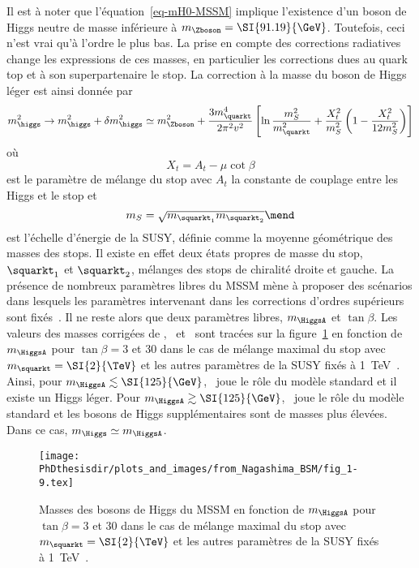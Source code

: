 Il est à noter que l'équation~\eqref{eq-mH0-MSSM} implique l'existence d'un boson de Higgs neutre de masse inférieure à $m_{\Zboson}=\SI{91.19}{\GeV}$.
Toutefois, ceci n'est vrai qu'à l'ordre le plus bas.
La prise en compte des corrections radiatives change les expressions de ces masses, en particulier les corrections dues au quark top et à son superpartenaire le stop.
La correction à la masse du boson de Higgs léger est ainsi donnée par~\cite{Nagashima_BSM}
\begin{equation}
m_{\higgs}^2 \to m_{\higgs}^2 + \delta m_{\higgs}^2
\simeq m_{\Zboson}^2
+ \frac{3 m_{\quarkt}^4}{2 \pi^2 v^2} \left[ \ln\frac{m_S^2}{m_{\quarkt}^2} + \frac{X_t^2}{m_S^2}\left(1-\frac{X_t^2}{12 m_S^2} \right) \right]
\end{equation}
où
\begin{equation}
X_t = A_t - \mu\cot\beta
\end{equation}
est le paramètre de mélange du stop avec $A_t$ la constante de couplage entre les Higgs et le stop
et
\begin{equation}
m_S = \sqrt{m_{\squarkt_1}m_{\squarkt_2}}
\mend
\end{equation}
est l'échelle d'énergie de la SUSY, définie comme la moyenne géométrique des masses des stops.
Il existe en effet deux états propres de masse du stop, $\squarkt_1$ et $\squarkt_2$, mélanges des stops de chiralité droite et gauche.
La présence de nombreux paramètres libres du MSSM mène à proposer des scénarios dans lesquels les paramètres intervenant dans les corrections d'ordres supérieurs sont fixés~\cite{Carena_2013,Bagnaschi_2019}.
Il ne reste alors que deux paramètres libres, $m_{\HiggsA}$ et $\tan\beta$.
Les valeurs des masses corrigées de \higgs, \Higgs\ et \Higgspm\ sont tracées sur la figure~\ref{fig-Higgs_corrected_masses_as_fct_of_mA_and_tanbeta} en fonction de $m_{\HiggsA}$ pour $\tan\beta=3$ et $30$ dans le cas de mélange maximal du stop avec $m_{\squarkt}=\SI{2}{\TeV}$ et les autres paramètres de la SUSY fixés à \SI{1}{\TeV}~\cite{Nagashima_BSM}.
Ainsi, pour $m_{\HiggsA} \lesssim \SI{125}{\GeV}$, \Higgs\ joue le rôle du modèle standard et il existe un Higgs léger.
Pour $m_{\HiggsA} \gtrsim \SI{125}{\GeV}$, \higgs\ joue le rôle du modèle standard et les bosons de Higgs supplémentaires sont de masses plus élevées.
Dans ce cas, $m_{\Higgs}\simeq m_{\HiggsA}$.
\begin{figure}[h]
\centering
\texttt{[image: \\PhDthesisdir/plots\_and\_images/from\_Nagashima\_BSM/fig\_1-9.tex]}
\caption[Masses des bosons de Higgs du MSSM.]{Masses des bosons de Higgs du MSSM en fonction de $m_{\HiggsA}$ pour $\tan\beta=3$ et $30$ dans le cas de mélange maximal du stop avec $m_{\squarkt}=\SI{2}{\TeV}$ et les autres paramètres de la SUSY fixés à \SI{1}{\TeV}~\cite{Nagashima_BSM}.}
\label{fig-Higgs_corrected_masses_as_fct_of_mA_and_tanbeta}
\end{figure}
